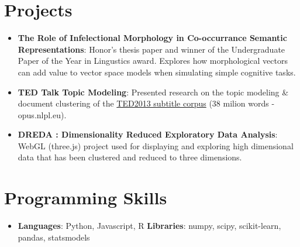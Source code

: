 \documentclass[letterpaper,11pt]{article}
\newcommand{\resumeItem}[2]{
  \item\small{
    \textbf{#1}{: #2 \vspace{-2pt}}
  }
}
\newcommand{\resumeSubItem}[2]{\resumeItem{#1}{#2}\vspace{-4pt}}
\newcommand{\resumeSubHeadingListStart}{\begin{itemize}[leftmargin=*]}
\newcommand{\resumeSubHeadingListEnd}{\end{itemize}}
\begin{document}
\section{Projects}
  \resumeSubHeadingListStart
    \resumeSubItem{The Role of Infelectional Morphology in Co-occurrance Semantic Representations}
    {Honor's thesis paper and winner of the Undergraduate Paper of the Year in Lingustics award. Explores how morphological vectors can add value to vector space models when simulating simple cognitive tasks.}
    \resumeSubItem{TED Talk Topic Modeling}
      {Presented research on the topic modeling \& document clustering of the \href{http://opus.nlpl.eu/TED2013.php}{TED2013 subtitle corpus} (38 milion words - opus.nlpl.eu).}
    \resumeSubItem{DREDA : Dimensionality Reduced Exploratory Data Analysis}
      {WebGL (three.js) project used for displaying and exploring high dimensional data that has been clustered and reduced to three dimensions.}
  \resumeSubHeadingListEnd
 

\section{Programming Skills}
 \resumeSubHeadingListStart
    \item{
      \textbf{Languages}{: Python, Javascript, R}
      \hfill
      \textbf{Libraries}{: numpy, scipy, scikit-learn, pandas, statsmodels}
    }
  \resumeSubHeadingListEnd


\end{document}
